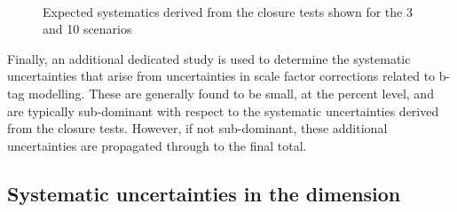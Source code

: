 \begin{figure}[]
  \centering
   ~~
  \caption{\label{fig:systematics} Expected systematics derived from the closure tests shown for
the 3 \ifb and 10 \ifb scenarios}
\end{figure}

Finally, an additional dedicated study is used to determine the
systematic uncertainties that arise from uncertainties in scale factor
corrections related to b-tag modelling. These are generally found to
be small, at the percent level, and are typically sub-dominant with
respect to the systematic uncertainties derived from the closure
tests. However, if not sub-dominant, these additional uncertainties
are propagated through to the final total.


\subsection{Systematic uncertainties in the \mht dimension\label{sec:syst-on-shape}}


